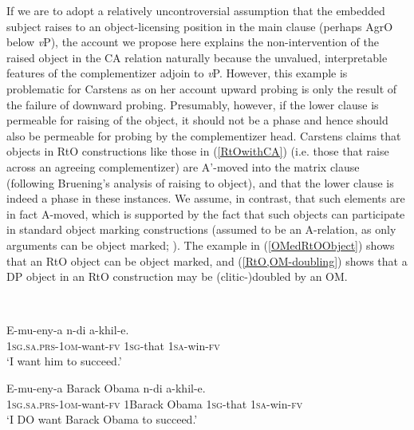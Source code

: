 If we are to adopt a relatively uncontroversial assumption that the embedded subject raises to an object-licensing position in the main clause (perhaps AgrO below \textit{v}P), the account we propose here explains the non-intervention of the raised object in the CA relation naturally because the unvalued, interpretable features of the complementizer adjoin to \textit{v}P. However, this example is problematic for Carstens as on her account upward probing is only the result of the failure of downward probing. Presumably, however, if the lower clause is permeable for raising of the object, it should not be a phase and hence should also be permeable for probing by the complementizer head. Carstens claims that objects in RtO constructions like those in (\ref{RtOwithCA}) (i.e. those that raise across an agreeing complementizer) are A’-moved into the matrix clause (following Bruening's \citeyear{Bruening:2001} analysis of raising to object), and that the lower clause is indeed a phase in these instances. We assume, in contrast, that such elements are in fact A-moved, which is supported by the fact that such objects can participate in standard object marking constructions (assumed to be an A-relation, as only arguments can be object marked; \citealt{Diercks:2011,SikukuEt:2017}). The example in (\ref{OMedRtOObject}) shows that an RtO object can be object marked, and (\ref{RtO,OM-doubling}) shows that a DP object in an RtO construction may be (clitic-)doubled by an OM.%

\ea
{} \\

\begin{xlist}

\ex \label{OMedRtOObject}
\gll E-mu-eny-a n-di a-khil-e. \\
1\textsc{sg}.\textsc{sa}.\textsc{prs}-1\textsc{om}-want-\textsc{fv} 1\textsc{sg}-that 1\textsc{sa}-win-\textsc{fv}\\
\glt `I want him to succeed.'

\ex \label{RtO,OM-doubling}
\gll E-mu-eny-a Barack Obama n-di a-khil-e.\\
1\textsc{sg}.\textsc{sa}.\textsc{prs}-1\textsc{om}-want-\textsc{fv} 1Barack Obama 1\textsc{sg}-that 1\textsc{sa}-win-\textsc{fv} \\
\glt `I DO want Barack Obama to succeed.'

\end{xlist}
\z

